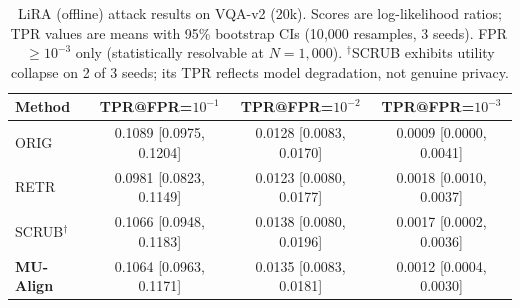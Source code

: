 \begin{table}[t]
\centering
\caption{%
  LiRA (offline) attack results on VQA-v2 (20k). Scores are
  log-likelihood ratios; TPR values are means with 95\% bootstrap
  CIs (10{,}000 resamples, 3 seeds). FPR\,$\geq 10^{-3}$ only
  (statistically resolvable at $N{=}1{,}000$).
  $^\dagger$SCRUB exhibits utility collapse on 2 of 3 seeds;
  its TPR reflects model degradation, not genuine privacy.
}
\label{tab:lira}
\begin{tabular}{lccc}
\toprule
Method & TPR@FPR=$10^{-1}$ & TPR@FPR=$10^{-2}$ & TPR@FPR=$10^{-3}$ \\
\midrule
ORIG & 0.1089 [0.0975, 0.1204] & 0.0128 [0.0083, 0.0170] & 0.0009 [0.0000, 0.0041] \\
RETR & 0.0981 [0.0823, 0.1149] & 0.0123 [0.0080, 0.0177] & 0.0018 [0.0010, 0.0037] \\
SCRUB$^\dagger$ & 0.1066 [0.0948, 0.1183] & 0.0138 [0.0080, 0.0196] & 0.0017 [0.0002, 0.0036] \\
\textbf{MU-Align} & 0.1064 [0.0963, 0.1171] & 0.0135 [0.0083, 0.0181] & 0.0012 [0.0004, 0.0030] \\
\bottomrule
\end{tabular}
\end{table}

